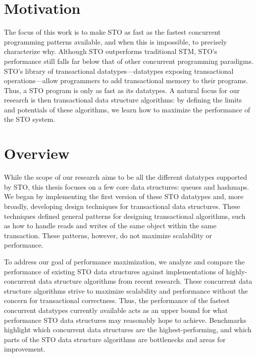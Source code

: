 \section{Motivation}
The focus of this work is to make STO as fast as the fastest concurrent programming patterns available, and when this is impossible, to precisely characterize why. Although STO outperforms traditional STM, STO’s performance still falls far below that of other concurrent programming paradigms. STO’s library of transactional datatypes---datatypes exposing transactional operations---allow programmers to add transactional memory to their programs. Thus, a STO program is only as fast as its datatypes. A natural focus for our research is then transactional data structure algorithms: by defining the limits and potentials of these algorithms, we learn how to maximize the performance of the STO system.

\section{Overview}
While the scope of our research aims to be all the different datatypes supported by STO, this thesis focuses on a few core data structures: queues and hashmaps. We began by implementing the first version of these STO datatypes and, more broadly, developing design techniques for transactional data structures. These techniques defined general patterns for designing transactional algorithms, such as how to handle reads and writes of the same object within the same transaction. These patterns, however, do not maximize scalability or performance.

To address our goal of performance maximization, we analyze and compare the performance of existing STO data structures against implementations of highly-concurrent data structure algorithms from recent research. These concurrent data structure algorithms strive to maximize scalability and performance without the concern for transactional correctness. Thus, the performance of the fastest concurrent datatypes currently available acts as an upper bound for what performance STO data structures may reasonably hope to achieve. Benchmarks highlight which concurrent data structures are the highest-performing, and which parts of the STO data structure algorithms are bottlenecks and areas for improvement. 

